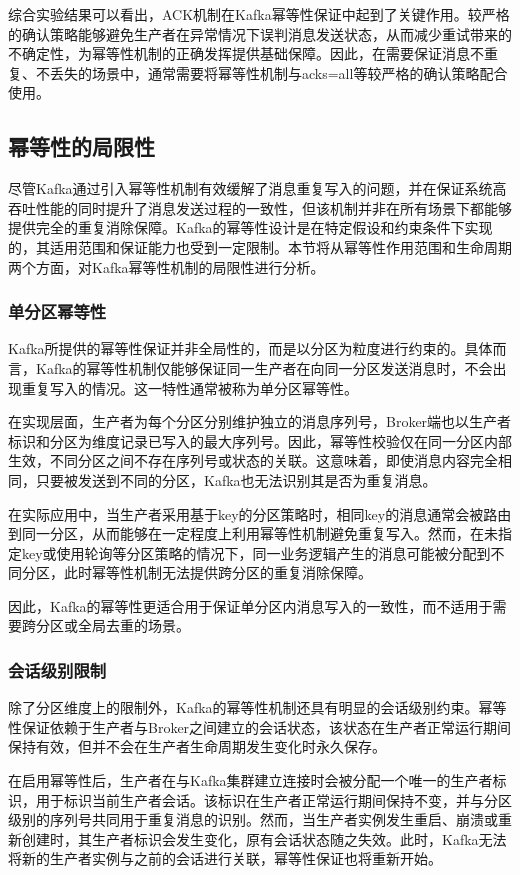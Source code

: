 综合实验结果可以看出，ACK机制在Kafka幂等性保证中起到了关键作用。较严格的确认策略能够避免生产者在异常情况下误判消息发送状态，从而减少重试带来的不确定性，为幂等性机制的正确发挥提供基础保障。因此，在需要保证消息不重复、不丢失的场景中，通常需要将幂等性机制与acks=all等较严格的确认策略配合使用。
\subsection{幂等性的局限性}
尽管Kafka通过引入幂等性机制有效缓解了消息重复写入的问题，并在保证系统高吞吐性能的同时提升了消息发送过程的一致性，但该机制并非在所有场景下都能够提供完全的重复消除保障。Kafka的幂等性设计是在特定假设和约束条件下实现的，其适用范围和保证能力也受到一定限制。本节将从幂等性作用范围和生命周期两个方面，对Kafka幂等性机制的局限性进行分析。
    \subsubsection{单分区幂等性}
Kafka所提供的幂等性保证并非全局性的，而是以分区为粒度进行约束的。具体而言，Kafka的幂等性机制仅能够保证同一生产者在向同一分区发送消息时，不会出现重复写入的情况。这一特性通常被称为单分区幂等性。

在实现层面，生产者为每个分区分别维护独立的消息序列号，Broker端也以生产者标识和分区为维度记录已写入的最大序列号。因此，幂等性校验仅在同一分区内部生效，不同分区之间不存在序列号或状态的关联。这意味着，即使消息内容完全相同，只要被发送到不同的分区，Kafka也无法识别其是否为重复消息。

在实际应用中，当生产者采用基于key的分区策略时，相同key的消息通常会被路由到同一分区，从而能够在一定程度上利用幂等性机制避免重复写入。然而，在未指定key或使用轮询等分区策略的情况下，同一业务逻辑产生的消息可能被分配到不同分区，此时幂等性机制无法提供跨分区的重复消除保障。

因此，Kafka的幂等性更适合用于保证单分区内消息写入的一致性，而不适用于需要跨分区或全局去重的场景。
    \subsubsection{会话级别限制}
除了分区维度上的限制外，Kafka的幂等性机制还具有明显的会话级别约束。幂等性保证依赖于生产者与Broker之间建立的会话状态，该状态在生产者正常运行期间保持有效，但并不会在生产者生命周期发生变化时永久保存。

在启用幂等性后，生产者在与Kafka集群建立连接时会被分配一个唯一的生产者标识，用于标识当前生产者会话。该标识在生产者正常运行期间保持不变，并与分区级别的序列号共同用于重复消息的识别。然而，当生产者实例发生重启、崩溃或重新创建时，其生产者标识会发生变化，原有会话状态随之失效。此时，Kafka无法将新的生产者实例与之前的会话进行关联，幂等性保证也将重新开始。


